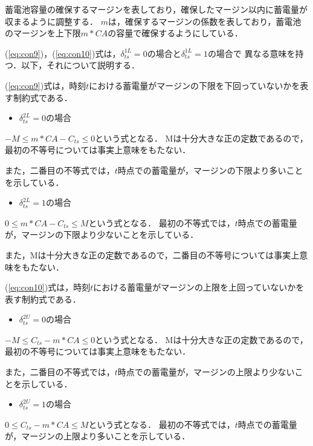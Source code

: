 \documentclass[a4paper,12pt,showkeys]{jreport}
\begin{document}
蓄電池容量の確保するマージンを表しており，確保したマージン以内に蓄電量が収まるように調整する．
$m$は，確保するマージンの係数を表しており，蓄電池のマージンを上下限$m * CA$の容量で確保するようにしている．

(\ref{eq:con9})，(\ref{eq:con10})式は，$\delta^{1L}_{ts}$$=0$の場合と$\delta^{1L}_{ts}$$=1$の場合で
異なる意味を持つ．以下，それについて説明する．

\vspace{\Cvs}
(\ref{eq:con9})式は，時刻$t$における蓄電量がマージンの下限を下回っていないかを表す制約式である．

\begin{itemize}
\item $\delta^{2L}_{ts}$$=0$の場合
\end{itemize}

$-M \le m * CA - C_{ts}\le 0$という式となる．
Mは十分大きな正の定数であるので，最初の不等号については事実上意味をもたない．

また，二番目の不等式では，$t$時点での蓄電量が，マージンの下限より多いことを示している．

\begin{itemize}
\item $\delta^{2L}_{ts}$$=1$の場合
\end{itemize}

$0 \le m * CA - C_{ts}\le M$という式となる．
最初の不等式では，$t$時点での蓄電量が，マージンの下限より少ないことを示している．

また，Mは十分大きな正の定数であるので，二番目の不等号については事実上意味をもたない．

\vspace{\Cvs}
(\ref{eq:con10})式は，時刻$t$における蓄電量がマージンの上限を上回っていないかを表す制約式である．

\begin{itemize}
\item $\delta^{2U}_{ts}$$=0$の場合
\end{itemize}

$-M \le C_{ts} - m * CA \le 0$という式となる．
Mは十分大きな正の定数であるので，最初の不等号については事実上意味をもたない．

また，二番目の不等式では，$t$時点での蓄電量が，マージンの上限より少ないことを示している．

\begin{itemize}
\item $\delta^{2U}_{ts}$$=1$の場合
\end{itemize}
$0 \le C_{ts} - m * CA\le M$という式となる．
最初の不等式では，$t$時点での蓄電量が，マージンの上限より多いことを示している．
\end{document}
